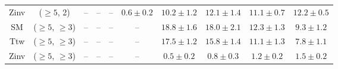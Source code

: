 \begin{table}[h!]
{\begin{tabular}{cccccccccc}
	Zinv & ($\ge5$, 2) & -- & -- & -- & $0.6\pm 0.2$ & $10.2\pm 1.2$ & $12.1\pm 1.4$ & $11.1\pm 0.7$ & $12.2\pm 0.5$ \\[0.5ex] 
	SM & ($\ge5$, $\ge3$) & -- & -- & -- & -- & $18.8\pm 1.6$ & $18.0\pm 2.1$ & $12.3\pm 1.3$ & $9.3\pm 1.2$ \\[0.5ex] 
	Ttw & ($\ge5$, $\ge3$) & -- & -- & -- & -- & $17.5\pm 1.2$ & $15.8\pm 1.4$ & $11.1\pm 1.3$ & $7.8\pm 1.1$ \\[0.5ex] 
	Zinv & ($\ge5$, $\ge3$) & -- & -- & -- & -- & $0.5\pm 0.2$ & $0.8\pm 0.3$ & $1.2\pm 0.2$ & $1.5\pm 0.2$ \\[0.5ex] 
	\hline
	\hline
\end{tabular}}
\end{table}
